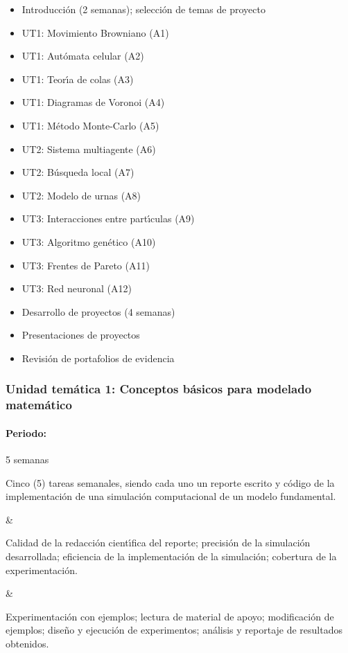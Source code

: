 \begin{itemize}[itemsep=-3pt]
\item{Introducci\'{o}n (2 semanas); selecci\'{o}n de temas de
  proyecto}
\item{UT1: Movimiento Browniano (A1)}
\item{UT1: Aut\'{o}mata celular (A2)}
\item{UT1: Teor\'{\i}a de colas (A3)}
\item{UT1: Diagramas de Voronoi (A4)}
\item{UT1: M\'{e}todo Monte-Carlo (A5)}
\item{UT2: Sistema multiagente (A6)}
\item{UT2: B\'{u}squeda local (A7)}
\item{UT2: Modelo de urnas (A8)}
\item{UT3: Interacciones entre part\'{\i}culas (A9)}
\item{UT3: Algoritmo gen\'{e}tico (A10)}
\item{UT3: Frentes de Pareto (A11)}
\item{UT3: Red neuronal (A12)}
\item{Desarrollo de proyectos (4 semanas)}  
\item{Presentaciones de proyectos}
\item{Revisi\'{o}n de portafolios de evidencia}
\end{itemize}


\subsubsection{Unidad tem\'{a}tica 1: Conceptos b\'{a}sicos para modelado matem\'{a}tico}

\paragraph{Periodo:} 5 semanas



Cinco (5) tareas semanales, siendo cada uno un reporte escrito y
c\'{o}digo de la implementaci\'{o}n de una simulaci\'{o}n
computacional de un modelo fundamental.

&

Calidad de la redacci\'{o}n cient\'{\i}fica del reporte; 
precisi\'{o}n de la simulaci\'{o}n desarrollada;
eficiencia de la implementaci\'{o}n de la simulaci\'{o}n;
cobertura de la experimentaci\'{o}n.

&

Experimentaci\'{o}n con ejemplos; lectura de material de apoyo;
modificaci\'{o}n de ejemplos; dise\~{n}o y ejecuci\'{o}n de experimentos;
an\'{a}lisis y reportaje de resultados obtenidos.


